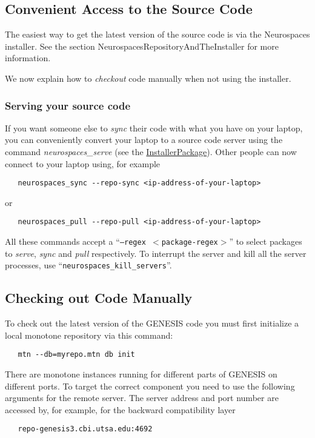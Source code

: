 \documentclass[12pt]{article}
\begin{document}
\subsection*{Convenient Access to the Source Code}

The easiest way to get the latest version of the source code is via the Neurospaces installer. See the section  NeurospacesRepositoryAndTheInstaller for more information.

We now explain how to {\it checkout} code manually when not using the installer.

\subsubsection*{Serving your source code}

If you want someone else to {\it sync} their code with what you have on your laptop, you can conveniently convert your laptop to a source code server using the command {\it neurospaces\_serve} (see the \href{../installer-package/installer-package.tex}{InstallerPackage}). Other people can now connect to your laptop using, for example
\begin{verbatim}
   neurospaces_sync --repo-sync <ip-address-of-your-laptop>
\end{verbatim}
or
\begin {verbatim}
   neurospaces_pull --repo-pull <ip-address-of-your-laptop>
\end{verbatim}
All these commands accept a ``{\tt --regex $<$package-regex$>$}'' to select packages to {\it serve}, {\it sync} and {\it pull} respectively. To interrupt the server and kill all the server processes, use ``{\tt neurospaces\_kill\_servers}''.

\subsection*{Checking out Code Manually}

To check out the latest version of the GENESIS code you must first initialize a local monotone repository via this command:
\begin{verbatim}
   mtn --db=myrepo.mtn db init 
\end{verbatim}
There are monotone instances running for different parts of GENESIS on different ports. To target the correct component you need to use the following arguments for the remote server. The server address and port number are accessed by, for example, for the backward compatibility layer
\begin{verbatim}
   repo-genesis3.cbi.utsa.edu:4692
\end{verbatim}
\end{document}
